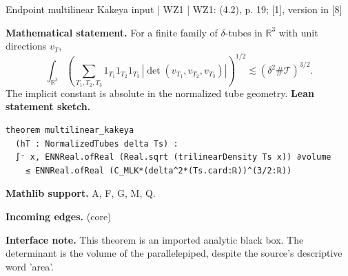 \documentclass[10pt,a4paper]{article}
\newcommand{\nodecard}[1]{\hyperlink{node-#1}{\texttt{\detokenize{#1}}}}
\begin{document}
\begin{minipage}{\linewidth}
\hypertarget{node-T4_2}{}
\begin{tcolorbox}[colback=white,colframe=planefg,colbacktitle=planebg,coltitle=ink,boxrule=0.45pt,arc=1.6mm,left=3mm,right=3mm,top=2mm,bottom=2mm,title={\sffamily\bfseries WZ1 Theorem 4.2 \hfill \texttt{T4\_2}}]
{\sffamily\small\color{muted}Endpoint multilinear Kakeya input | WZ1 | WZ1: (4.2), p. 19; [1], version in [8]}\par
\textbf{Mathematical statement.} For a finite family of $\delta$-tubes in $\mathbb R^3$ with unit directions $v_T$,
\[
\int_{\mathbb R^3}\left(\sum_{T_1,T_2,T_3}
1_{T_1}1_{T_2}1_{T_3}\,|\det(v_{T_1},v_{T_2},v_{T_3})|\right)^{1/2}
\lesssim(\delta^2\#\mathcal T)^{3/2}.
\]
The implicit constant is absolute in the normalized tube geometry.
\smallskip\textbf{Lean statement sketch.}
\begin{Verbatim}[fontsize=\small,breaklines=true,breakanywhere=true,tabsize=2]
theorem multilinear_kakeya
  (hT : NormalizedTubes delta Ts) :
  ∫⁻ x, ENNReal.ofReal (Real.sqrt (trilinearDensity Ts x)) ∂volume
    ≤ ENNReal.ofReal (C_MLK*(delta^2*(Ts.card:ℝ))^(3/2:ℝ))
\end{Verbatim}
{\footnotesize\textbf{Mathlib support.} A, F, G, M, Q.\par
\textbf{Incoming edges.} \nodecard{XBCT} (core)\par}
{\footnotesize\textbf{Interface note.} This theorem is an imported analytic black box. The determinant is the volume of the parallelepiped, despite the source's descriptive word 'area'.}
\end{tcolorbox}\end{minipage}\par\medskip
\end{document}
